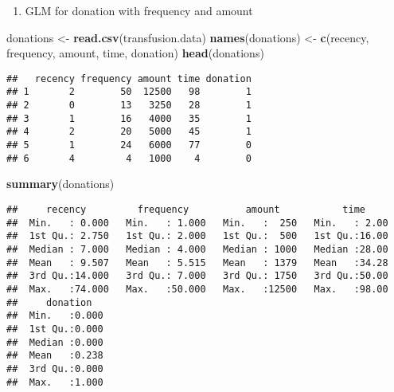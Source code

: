 \documentclass[
]{article}
\newenvironment{Shaded}{\begin{snugshade}}{\end{snugshade}}
\newcommand{\FunctionTok}[1]{\textcolor[rgb]{0.13,0.29,0.53}{\textbf{#1}}}
\newcommand{\NormalTok}[1]{#1}
\newcommand{\OtherTok}[1]{\textcolor[rgb]{0.56,0.35,0.01}{#1}}
\newcommand{\StringTok}[1]{\textcolor[rgb]{0.31,0.60,0.02}{#1}}
\providecommand{\tightlist}{%
  \setlength{\itemsep}{0pt}\setlength{\parskip}{0pt}}
\begin{document}
\begin{enumerate}
\def\labelenumi{\alph{enumi}.}
\tightlist
\item
  GLM for donation with frequency and amount
\end{enumerate}

\begin{Shaded}
\begin{Highlighting}[]
\NormalTok{donations }\OtherTok{\textless{}{-}} \FunctionTok{read.csv}\NormalTok{(}\StringTok{\textquotesingle{}transfusion.data\textquotesingle{}}\NormalTok{)}
\FunctionTok{names}\NormalTok{(donations) }\OtherTok{\textless{}{-}} \FunctionTok{c}\NormalTok{(}\StringTok{\textquotesingle{}recency\textquotesingle{}}\NormalTok{, }\StringTok{\textquotesingle{}frequency\textquotesingle{}}\NormalTok{, }\StringTok{\textquotesingle{}amount\textquotesingle{}}\NormalTok{, }\StringTok{\textquotesingle{}time\textquotesingle{}}\NormalTok{, }\StringTok{\textquotesingle{}donation\textquotesingle{}}\NormalTok{)}
\FunctionTok{head}\NormalTok{(donations)}
\end{Highlighting}
\end{Shaded}

\begin{verbatim}
##   recency frequency amount time donation
## 1       2        50  12500   98        1
## 2       0        13   3250   28        1
## 3       1        16   4000   35        1
## 4       2        20   5000   45        1
## 5       1        24   6000   77        0
## 6       4         4   1000    4        0
\end{verbatim}

\begin{Shaded}
\begin{Highlighting}[]
\FunctionTok{summary}\NormalTok{(donations)}
\end{Highlighting}
\end{Shaded}

\begin{verbatim}
##     recency         frequency          amount           time      
##  Min.   : 0.000   Min.   : 1.000   Min.   :  250   Min.   : 2.00  
##  1st Qu.: 2.750   1st Qu.: 2.000   1st Qu.:  500   1st Qu.:16.00  
##  Median : 7.000   Median : 4.000   Median : 1000   Median :28.00  
##  Mean   : 9.507   Mean   : 5.515   Mean   : 1379   Mean   :34.28  
##  3rd Qu.:14.000   3rd Qu.: 7.000   3rd Qu.: 1750   3rd Qu.:50.00  
##  Max.   :74.000   Max.   :50.000   Max.   :12500   Max.   :98.00  
##     donation    
##  Min.   :0.000  
##  1st Qu.:0.000  
##  Median :0.000  
##  Mean   :0.238  
##  3rd Qu.:0.000  
##  Max.   :1.000
\end{verbatim}
\end{document}
